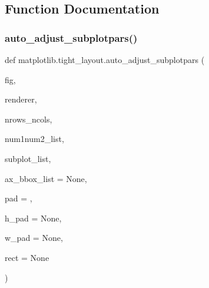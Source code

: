 \subsection{Function Documentation}
\mbox{\label{namespacematplotlib_1_1tight__layout_aac0a3ed65fdbe116ec3c52a261a0d0da}} 
\subsubsection{\texorpdfstring{auto\+\_\+adjust\+\_\+subplotpars()}{auto\_adjust\_subplotpars()}}
{\footnotesize\ttfamily def matplotlib.\+tight\+\_\+layout.\+auto\+\_\+adjust\+\_\+subplotpars (\begin{DoxyParamCaption}\item[{}]{fig,  }\item[{}]{renderer,  }\item[{}]{nrows\+\_\+ncols,  }\item[{}]{num1num2\+\_\+list,  }\item[{}]{subplot\+\_\+list,  }\item[{}]{ax\+\_\+bbox\+\_\+list = {\ttfamily None},  }\item[{}]{pad = {},  }\item[{}]{h\+\_\+pad = {\ttfamily None},  }\item[{}]{w\+\_\+pad = {\ttfamily None},  }\item[{}]{rect = {\ttfamily None} }\end{DoxyParamCaption})}

